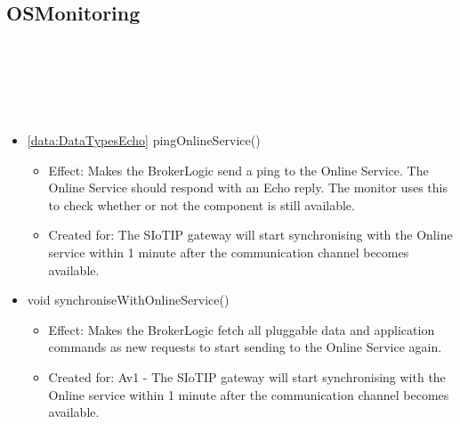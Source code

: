   \subsection{OSMonitoring}\label{int:GatewayGatewayOnlineServiceBrokerOSBrokerLogicOSMonitoring}
    \begin{description}
      \item[Provided by:] \iconcomponent{}~
      \item[Required by:] \iconcomponent{}~
      \item[Operations:] ~
    \begin{itemize}[noitemsep,nolistsep,leftmargin=-.25cm]
      \item \textsf{\ref{data:DataTypesEcho} pingOnlineService()}
        \begin{itemize}[noitemsep,nolistsep]
           \item Effect: Makes the BrokerLogic send a ping to the Online Service. The Online Service should respond with an Echo reply. The monitor uses this to check whether or not the component is still available.
\item Created for: The SIoTIP gateway will start synchronising with the Online service within 1 minute after the communication channel becomes available.
        \end{itemize}
      \item \textsf{void synchroniseWithOnlineService()}
        \begin{itemize}[noitemsep,nolistsep]
           \item Effect: Makes the BrokerLogic fetch all pluggable data and application commands as new requests to start sending to the Online Service again.
\item Created for: Av1 - The SIoTIP gateway will start synchronising with the Online service within 1 minute after the communication channel becomes available.
        \end{itemize}
    \end{itemize}
    \end{description}

